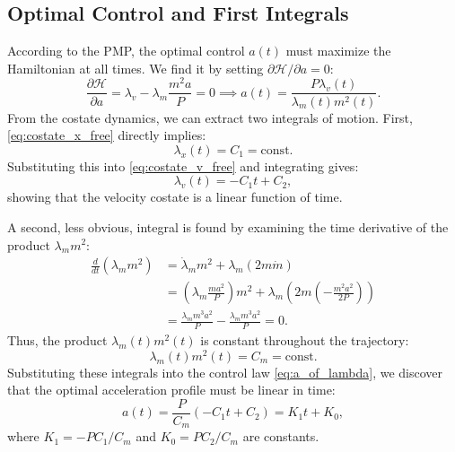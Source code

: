 \documentclass[journal, a4paper]{IEEEtran}
\begin{document}
\subsection{Optimal Control and First Integrals}
According to the PMP, the optimal control $a(t)$ must maximize the Hamiltonian at all times. We find it by setting $\partial\mathcal{H}/\partial a = 0$:
\begin{equation}
    \frac{\partial\mathcal{H}}{\partial a} = \lambda_v - \lambda_m \frac{m^2 a}{P} = 0 \implies a(t) = \frac{P \lambda_v(t)}{\lambda_m(t) m^2(t)}.
    \label{eq:a_of_lambda}
\end{equation}
From the costate dynamics, we can extract two integrals of motion. First, \eqref{eq:costate_x_free} directly implies:
\begin{equation}
    \lambda_x(t) = C_1 = \text{const}.
\end{equation}
Substituting this into \eqref{eq:costate_v_free} and integrating gives:
\begin{equation}
    \lambda_v(t) = -C_1 t + C_2,
\end{equation}
showing that the velocity costate is a linear function of time.

A second, less obvious, integral is found by examining the time derivative of the product $\lambda_m m^2$:
\begin{align}
    \frac{d}{dt}(\lambda_m m^2) &= \dot\lambda_m m^2 + \lambda_m (2m \dot m) \nonumber\\
    &= \left(\lambda_m \frac{m a^2}{P}\right) m^2 + \lambda_m \left(2m \left(-\frac{m^2 a^2}{2P}\right)\right) \nonumber\\
    &= \frac{\lambda_m m^3 a^2}{P} - \frac{\lambda_m m^3 a^2}{P} = 0.
\end{align}
Thus, the product $\lambda_m(t) m^2(t)$ is constant throughout the trajectory:
\begin{equation}
    \lambda_m(t) m^2(t) = C_m = \text{const}.
    \label{eq:mass_costate_integral}
\end{equation}
Substituting these integrals into the control law \eqref{eq:a_of_lambda}, we discover that the optimal acceleration profile must be linear in time:
\begin{equation}
    a(t) = \frac{P}{C_m}(-C_1 t + C_2) = K_1 t + K_0,
\end{equation}
where $K_1 = -PC_1/C_m$ and $K_0 = PC_2/C_m$ are constants.
\end{document}
